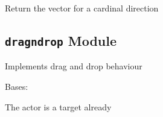 \documentclass[letterpaper,10pt,english]{sphinxmanual}
\begin{document}

\begin{fulllineitems}
\label{blocks:serge.blocks.directions.getVectorFromCardinal}
Return the vector for a cardinal direction

\end{fulllineitems}



\subsection{\texttt{dragndrop} Module}
\label{blocks:dragndrop-module}\label{blocks:module-serge.blocks.dragndrop}
Implements drag and drop behaviour

\begin{fulllineitems}
\label{blocks:serge.blocks.dragndrop.AlreadyATarget}
Bases: 

The actor is a target already

\end{fulllineitems}

\end{document}
